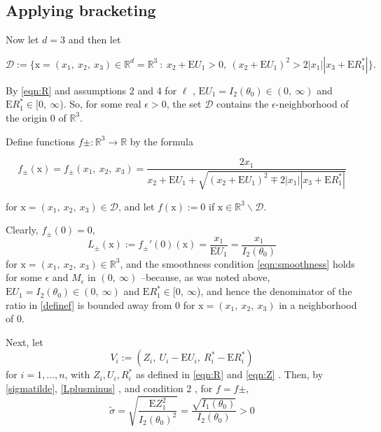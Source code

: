 \subsection*{Applying bracketing}

Now let $d=3$ and then let

$$\mathcal{D} :=\{\mathrm{x}=(x_{1},\ x_{2},\ x_{3})\in \mathbb{R}^{d}=\mathbb{R}^{3}\ :\ x_{2}+\mathrm{E}U_{1}>0,\ (x_{2}+\mathrm{E}U_{1})^{2}>2|x_{1}||x_{3}+\mathrm{E}R_{1}^{*}|\}.$$

By \eqref{eqn:R} and assumptions 2 and 4 for $\ell$ , $\mathrm{E}U_{1}=I_2(\theta_{0})\in(0,\ \infty)$ and $\mathrm{E}R_{1}^{*}\in[0,\ \infty$). So, for some real $\epsilon>0$, the set $\mathcal{D}$ contains the $\epsilon$-neighborhood of the origin $0$ of $\mathbb{R}^{3}.$

Define functions $f\pm:\mathbb{R}^{3}\rightarrow \mathbb{R}$ by the formula

\begin{equation}\label{definef}
f_{\pm}(\displaystyle \mathrm{x})=f_{\pm}(x_{1},\ x_{2},\ x_{3})=\frac{2x_{1}}{x_{2}+\mathrm{E}U_{1}+\sqrt{(x_{2}+\mathrm{E}U_{1})^{2}\mp 2|x_{1}||x_{3}+\mathrm{E}R_{1}^{*}|}}
\end{equation}

for $\mathrm{x}=(x_{1},\ x_{2},\ x_{3})\in \mathcal{D}$, and let $f(\mathrm{x}) :=0$ if $\mathrm{x}\in \mathbb{R}^{3}\backslash \mathcal{D}$. 

Clearly, $f_{\pm}(0)=0,$
\begin{equation}\label{Lplusminus}
L_{\pm}(\displaystyle \mathrm{x}):=f_{\pm}'(0)(\mathrm{x})=\frac{x_{1}}{\mathrm{E}U_{1}}=\frac{x_{1}}{I_2(\theta_{0})}
\end{equation}
for $\mathrm{x}=(x_{1},\ x_{2},\ x_{3})\in \mathbb{R}^{3}$, and the smoothness condition \eqref{eqn:smoothness} holds for some $\epsilon$ and $M_{\epsilon}$ in $(0,\ \infty)$ --because, as was noted above, $\mathrm{E}U_{1}=I_2(\theta_{0})\in(0,\ \infty)$ and $\mathrm{E}R_{1}^{*}\in[0,\ \infty$), and hence the denominator of the ratio in \eqref{definef} is bounded away from $0$ for $\mathrm{x}=(x_{1},\ x_{2},\ x_{3})$ in a neighborhood of $0.$

Next, let
\begin{equation}\label{Vi}
V_{i}:=(Z_{i},\ U_{i}-\mathrm{E}U_{i},\ R_{i}^{*}-\mathrm{E}R_{i}^{*})
\end{equation}
for $i=1,\ldots,n$, with $Z_{i}, U_{i}, R_{i}^{*}$ as defined in \eqref{eqn:R} and \eqref{eqn:Z} . Then, by \eqref{sigmatilde}, \eqref{Lplusminus} , and condition 2 , for $f=f\pm,$
\begin{equation}\label{sigmatilde1}
\tilde{\sigma} = \sqrt{\frac{\mathrm{E}Z_{1}^{2}}{I_2(\theta_{0})^{2}}}=\frac{\sqrt{I_1(\theta_0)}}{I_2(\theta_{0})}>0
\end{equation}

